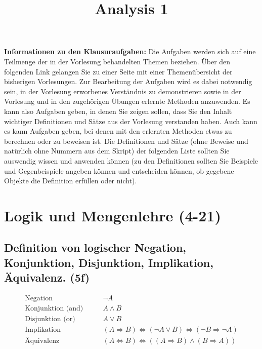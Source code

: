 \documentclass[10pt,a4paper,twoside]{article}
\title{Analysis 1}
\begin{document}
\pagestyle{fancy}
\setcounter{page}{1}
\maketitle

\textbf{Informationen zu den Klausuraufgaben:} Die Aufgaben werden sich auf eine Teilmenge der in der Vorlesung behandelten Themen beziehen. Über den folgenden Link gelangen Sie zu einer Seite mit einer 
Themenübersicht der bisherigen Vorlesungen. 
Zur Bearbeitung der Aufgaben wird es dabei notwendig sein, in der Vorlesung erworbenes Verständnis zu demonstrieren sowie in der Vorlesung und in den zugehörigen Übungen erlernte Methoden anzuwenden. Es kann also Aufgaben geben, in denen Sie zeigen sollen, dass Sie den Inhalt wichtiger Definitionen und Sätze aus der Vorlesung verstanden haben. Auch kann es kann Aufgaben geben, bei denen mit den erlernten Methoden etwas zu berechnen oder zu beweisen ist. Die Definitionen und Sätze (ohne Beweise und natürlich ohne Nummern aus dem Skript) der folgenden Liste sollten Sie auswendig wissen und anwenden können (zu den Definitionen sollten Sie Beispiele und Gegenbeispiele angeben können und entscheiden können, ob gegebene Objekte die Definition erfüllen oder nicht). 

\tableofcontents
\cleardoublepage

\setcounter{page}{1}
\fancyhead[LE,RO]{\rightmark}
\fancyhead[LO,RE]{\leftmark}
\fancyfoot[LE,RO]{\thepage}

\section{Logik und Mengenlehre (4-21)}

\subsection{Definition von logischer Negation, Konjunktion, Disjunktion, Implikation, Äquivalenz. (5f)}
\begin{equation}
\begin{split}
\text{Negation} \qquad & \neg A \\
\text{Konjunktion (and)}  \qquad & A \wedge B \\
\text{Disjunktion (or)}  \qquad & A \vee B \\
\text{Implikation}  \qquad & (A \Rightarrow B) \Leftrightarrow (\neg A \vee B) \Leftrightarrow (\neg B \Rightarrow \neg A) \\
\text{Äquivalenz}  \qquad & (A \Leftrightarrow B) \Leftrightarrow ((A \Rightarrow B) \wedge (B \Rightarrow A))
\end{split}
\end{equation}
\end{document}
